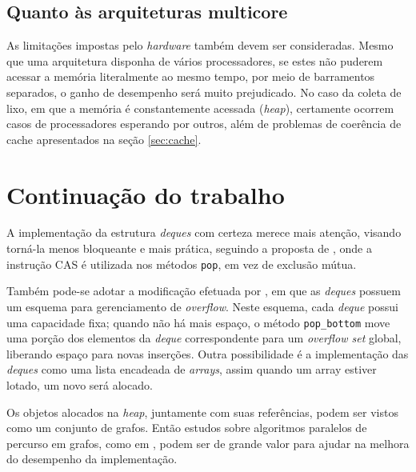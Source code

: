 \documentclass[ccc, pg2]{esinucpel}
\begin{document}
\subsection{Quanto às arquiteturas multicore}
As limitações impostas pelo {\it hardware} também devem ser consideradas. Mesmo que uma arquitetura disponha de vários processadores, se estes não puderem acessar a memória literalmente ao mesmo tempo, por meio de barramentos separados, o ganho de desempenho será muito prejudicado. No caso da coleta de lixo, em que a memória é constantemente acessada ({\it heap}), certamente ocorrem casos de processadores esperando por outros, além de problemas de coerência de cache apresentados na seção \ref{sec:cache}.

\section{Continuação do trabalho}
A implementação da estrutura {\it deques} com certeza merece mais atenção, visando torná-la menos bloqueante e mais prática, seguindo a proposta de \cite{bib:arora:worksteal}, onde a instrução CAS é utilizada nos métodos {\tt pop}, em vez de exclusão mútua. %

Também pode-se adotar a modificação efetuada por \cite{bib:flood:pargc}, em que as {\it deques} possuem um esquema para gerenciamento de {\it overflow}. Neste esquema, cada {\it deque} possui uma capacidade fixa; quando não há mais espaço, o método {\tt pop\_bottom} move uma porção dos elementos da {\it deque} correspondente para um {\it overflow set} global, liberando espaço para novas inserções. Outra possibilidade é a implementação das {\it deques} como uma lista encadeada de {\it arrays}, assim quando um array estiver lotado, um novo será alocado.

Os objetos alocados na {\it heap}, juntamente com suas referências, podem ser vistos como um conjunto de grafos. Então estudos sobre algoritmos paralelos de percurso em grafos, como em \cite{bib:bfs}, podem ser de grande valor para ajudar na melhora do desempenho da implementação.


\end{document}
